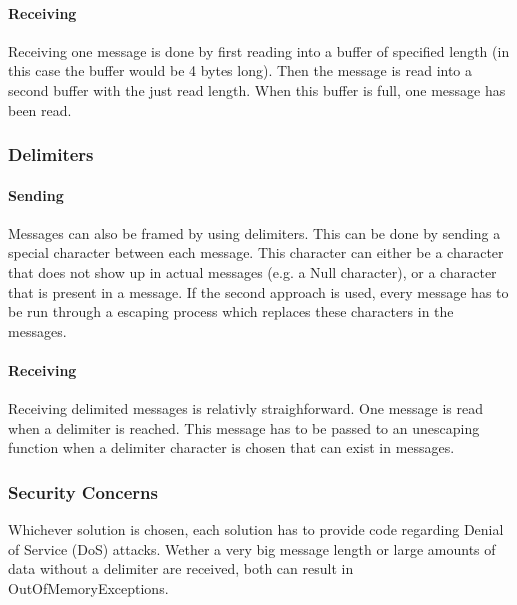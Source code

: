 \paragraph{Receiving}

Receiving one message is done by first reading into a buffer of specified length (in this case the buffer would be 4 bytes long). Then the message is read into a second buffer with the just read length. When this buffer is full, one message has been read.

\subsubsection{Delimiters}

\paragraph{Sending}

Messages can also be framed by using delimiters. This can be done by sending a special character between each message. This character can either be a character that does not show up in actual messages (e.g. a Null character), or a character that is present in a message. If the second approach is used, every message has to be run through a escaping process which replaces these characters in the messages.

\paragraph{Receiving}

Receiving delimited messages is relativly straighforward. One message is read when a delimiter is reached. This message has to be passed to an unescaping function when a delimiter character is chosen that can exist in messages.

\subsubsection{Security Concerns}

Whichever solution is chosen, each solution has to provide code regarding Denial of Service (DoS) attacks. Wether a very big message length or large amounts of data without a delimiter are received, both can result in OutOfMemoryExceptions.
